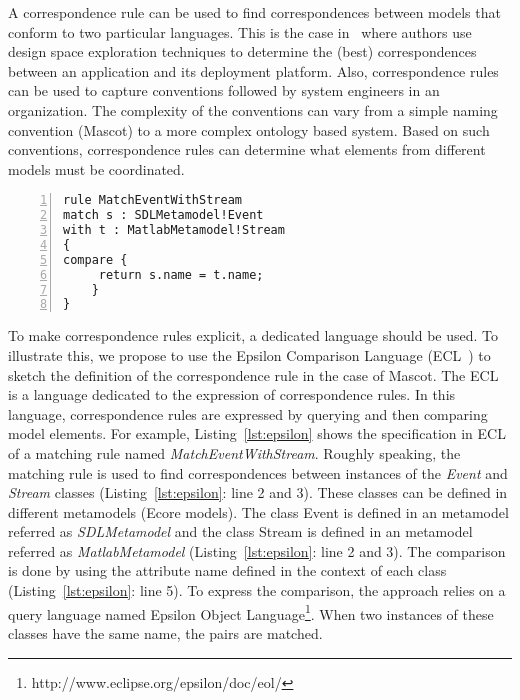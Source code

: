 {%
A correspondence rule can be used to find correspondences between models that conform to two particular languages. This is the case in~\cite{kofmanbib} where authors use design space exploration techniques to determine the (best) correspondences between an application and its deployment platform. Also, correspondence rules can be used to capture conventions followed by system engineers in an organization. The complexity of the conventions can vary from a simple naming convention (\eg Mascot) to a more complex ontology based system. Based on such conventions, correspondence rules can determine what elements from different models must be coordinated.    

\begin{lstlisting}[language=epsilon, caption={Specification of the Mascot correspondence rule by using the Epsilon Comparison Language}, label={lst:epsilon}, 	basicstyle=\scriptsize\ttfamily, backgroundcolor=\color{LGrey}, numbers=left, xleftmargin=2pt]
rule MatchEventWithStream
match s : SDLMetamodel!Event
with t : MatlabMetamodel!Stream 
{
compare {
	 return s.name = t.name;
	}
}
\end{lstlisting}

To make correspondence rules explicit, a dedicated language should be used. To illustrate this, we propose to use the Epsilon Comparison Language (ECL~\cite{epsilonbib}) to sketch the definition of the correspondence rule in the case of Mascot. The ECL is a language dedicated to the expression of correspondence rules. In this language, correspondence rules are expressed by querying and then comparing model elements. For example, Listing~\ref{lst:epsilon} shows the specification in ECL of a matching rule named \emph{MatchEventWithStream}. Roughly speaking, the matching rule is used to find correspondences between instances of the \emph{Event} and \emph{Stream} classes (Listing~\ref{lst:epsilon}: line 2 and 3). These classes can be defined in different metamodels (\ie Ecore models). The class Event is defined in an metamodel referred as \emph{SDLMetamodel} and the class Stream is defined in an metamodel referred as \emph{MatlabMetamodel} (Listing~\ref{lst:epsilon}: line 2 and 3). The comparison is done by using the attribute name defined in the context of each class (Listing~\ref{lst:epsilon}: line 5). To express the comparison, the approach relies on a query language named Epsilon Object Language\footnote{http://www.eclipse.org/epsilon/doc/eol/}. When two instances of these classes have the same name, the pairs are matched.

}

